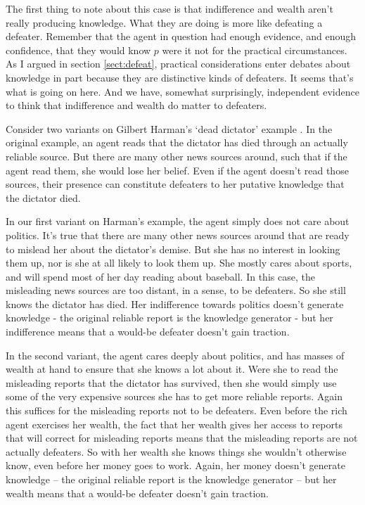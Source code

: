 \documentclass[oneside, a4paper]{book}
\begin{document}
The first thing to note about this case is that indifference and wealth aren't really producing knowledge. What they are doing is more like defeating a defeater. Remember that the agent in question had enough evidence, and enough confidence, that they would know \(p\) were it not for the practical circumstances. As I argued in section \ref{sect:defeat}, practical considerations enter debates about knowledge in part because they are distinctive kinds of defeaters. It seems that's what is going on here. And we have, somewhat surprisingly, independent evidence to think that indifference and wealth do matter to defeaters.

Consider two variants on Gilbert Harman's `dead dictator' example \citep[75]{Harman1973}. In the original example, an agent reads that the dictator has died through an actually reliable source. But there are many other news sources around, such that if the agent read them, she would lose her belief. Even if the agent doesn't read those sources, their presence can constitute defeaters to her putative knowledge that the dictator died.

In our first variant on Harman's example, the agent simply does not care about politics. It's true that there are many other news sources around that are ready to mislead her about the dictator's demise. But she has no interest in looking them up, nor is she at all likely to look them up. She mostly cares about sports, and will spend most of her day reading about baseball. In this case, the misleading news sources are too distant, in a sense, to be defeaters. So she still knows the dictator has died. Her indifference towards politics doesn't generate knowledge - the original reliable report is the knowledge generator - but her indifference means that a would-be defeater doesn't gain traction.

In the second variant, the agent cares deeply about politics, and has masses of wealth at hand to ensure that she knows a lot about it. Were she to read the misleading reports that the dictator has survived, then she would simply use some of the very expensive sources she has to get more reliable reports. Again this suffices for the misleading reports not to be defeaters. Even before the rich agent exercises her wealth, the fact that her wealth gives her access to reports that will correct for misleading reports means that the misleading reports are not actually defeaters. So with her wealth she knows things she wouldn't otherwise know, even before her money goes to work. Again, her money doesn't generate knowledge -- the original reliable report is the knowledge generator -- but her wealth means that a would-be defeater doesn't gain traction.
\end{document}
